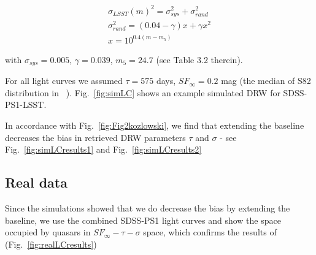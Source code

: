 \documentclass[twocolumn]{aastex62}
\begin{document}
\begin{eqnarray}
\sigma_{LSST}(m)^{2} = \sigma_{sys}^{2} + \sigma_{rand}^{2} \\
\sigma_{rand}^{2} = (0.04-\gamma)x + \gamma x^{2} \\
x = 10^{0.4(m-m_{5})}
\end{eqnarray}

with  $\sigma_{sys} = 0.005$, $\gamma=0.039$, $m_{5} = 24.7$ (see Table 3.2  therein).

For all light curves we assumed  $\tau = 575 $ days, $SF_{\infty} = 0.2$ mag (the median of S82 distribution in ~\citet{macleod2010}). Fig.~\ref{fig:simLC} shows an example simulated DRW for SDSS-PS1-LSST.

\begin{figure*}%
\caption{Simulated DRW process sampled at real cadence of SDSS, PS1, and simulated cadence of LSST. To each observed  point we add Gaussian noise corresponding to the reported  heteroscedastic (different for all points) errors for SDSS-PS1, and simulated magnitude-dependent errors for LSST. }
\label{fig:simLC}
\end{figure*} 


In accordance with Fig.~\ref{fig:Fig2kozlowski}, we find that extending the baseline decreases the bias in retrieved DRW parameters  $\tau$ and $\sigma$ - see Fig.~\ref{fig:simLCresults1} and Fig.~\ref{fig:simLCresults2}


\begin{figure*}
\caption{Retrieved $\tau$ and $\sigma$  parameters for simulated LCs. }
\label{fig:simLCresults1}
\end{figure*} 

\begin{figure*}
\caption{Comparison of retrieved parameters in relation to input parameters, shown as Fig.18 in \citet{macleod2011} }
\label{fig:simLCresults2}
\end{figure*} 


\subsection{Real data}

Since the simulations showed that we do decrease the bias by extending the  baseline, we use the combined SDSS-PS1  light curves and show the space occupied by quasars in $SF_{\infty} - \tau - \sigma$ space, which confirms the results of \citet{macleod2011} (Fig.~\ref{fig:realLCresults})
\end{document}
